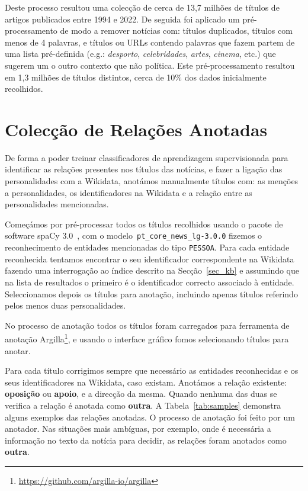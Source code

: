 \documentclass[a4paper, twocolumn, 11pt, twoside]{article}
\begin{document}
Deste processo resultou uma colecção de cerca de 13,7 milhões de títulos de artigos publicados entre 1994 e 2022. De seguida foi aplicado um pré-processamento de modo a remover notícias com: títulos duplicados, títulos com menos de 4 palavras, e títulos ou URLs contendo palavras que fazem partem de uma lista pré-definida (e.g.: \textit{desporto}, \textit{celebridades}, \textit{artes}, \textit{cinema}, etc.) que sugerem um o outro contexto que não política. Este pré-processamento resultou em 1,3 milhões de títulos distintos, cerca de 10\% dos dados inicialmente recolhidos.

\section{Colecção de Relações Anotadas}
\label{sec:rel_data_annot}

De forma a poder treinar classificadores de aprendizagem supervisionada para identificar as relações presentes nos títulos das notícias, e fazer a ligação das personalidades com a Wikidata, anotámos manualmente títulos com: as menções a personalidades, os identificadores na Wikidata e a relação entre as personalidades mencionadas.

Começámos por pré-processar todos os títulos recolhidos usando o pacote de software spaCy 3.0~\citep{spacy}, com o modelo~\texttt{pt\_core\_news\_lg-3.0.0} fizemos o reconhecimento de entidades mencionadas do tipo \texttt{PESSOA}. Para cada entidade reconhecida tentamos encontrar o seu identificador correspondente na Wikidata fazendo uma interrogação ao índice descrito na Secção~\ref{sec_kb} e assumindo que na lista de resultados o primeiro é o identificador correcto associado à entidade. Seleccionamos depois os títulos para anotação, incluindo apenas títulos referindo pelos menos duas personalidades.

No processo de anotação todos os títulos foram carregados para ferramenta de anotação Argilla\footnote{\url{https://github.com/argilla-io/argilla}}, e usando o interface gráfico fomos selecionando títulos para anotar. 

Para cada título corrigimos sempre que necessário as entidades reconhecidas e os seus identificadores na Wikidata, caso existam. Anotámos a relação existente: \textbf{oposição} ou \textbf{apoio}, e a direcção da mesma. Quando nenhuma das duas se verifica a relação é anotada como \textbf{outra}. A Tabela~\ref{tab:samples} demonstra alguns exemplos das relações anotadas. O processo de anotação foi feito por um anotador. Nas situações mais ambíguas, por exemplo, onde é necessária a informação no texto da notícia para decidir, as relações foram anotados como \textbf{outra}.
\end{document}
